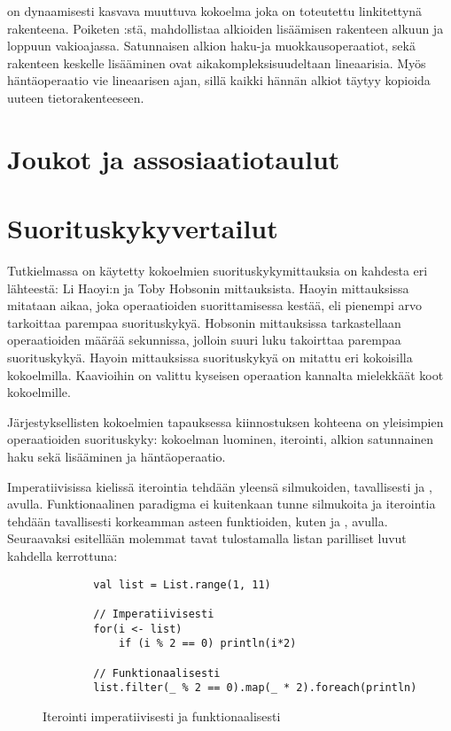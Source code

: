  on dynaamisesti kasvava muuttuva kokoelma joka on toteutettu linkitettynä rakenteena. Poiketen :stä,  mahdollistaa alkioiden lisäämisen rakenteen alkuun ja loppuun vakioajassa. Satunnaisen alkion haku-ja muokkausoperaatiot, sekä rakenteen keskelle lisääminen ovat aikakompleksisuudeltaan lineaarisia. Myös häntäoperaatio vie lineaarisen ajan, sillä kaikki hännän alkiot täytyy kopioida uuteen tietorakenteeseen.   
\cite{scalaCollections}


\section{Joukot ja assosiaatiotaulut}


\section{Suorituskykyvertailut}

Tutkielmassa on käytetty kokoelmien suorituskykymittauksia on kahdesta eri lähteestä: Li Haoyi:n\cite{haoyiBenchmark} ja Toby Hobsonin\cite{hobsonBenchmark} mittauksista. Haoyin mittauksissa mitataan aikaa, joka operaatioiden suorittamisessa kestää, eli pienempi arvo tarkoittaa parempaa suorituskykyä. Hobsonin mittauksissa tarkastellaan operaatioiden määrää sekunnissa, jolloin suuri luku takoirttaa parempaa suorituskykyä. Hayoin mittauksissa suorituskykyä on mitattu eri kokoisilla kokoelmilla. Kaavioihin on valittu kyseisen operaation kannalta mielekkäät koot kokoelmille.

Järjestyksellisten kokoelmien tapauksessa kiinnostuksen kohteena on yleisimpien operaatioiden suorituskyky: kokoelman luominen, iterointi, alkion satunnainen haku sekä lisääminen ja häntäoperaatio.

Imperatiivisissa kielissä iterointia tehdään yleensä silmukoiden, tavallisesti  ja , avulla. Funktionaalinen paradigma ei kuitenkaan tunne silmukoita ja iterointia tehdään tavallisesti korkeamman asteen funktioiden, kuten  ja , avulla.
\cite[Luku 2]{prorgrammingInScala3rd}
Seuraavaksi esitellään molemmat tavat tulostamalla listan parilliset luvut kahdella kerrottuna:
\begin{figure}[h]
    \begin{lstlisting}
        val list = List.range(1, 11)

        // Imperatiivisesti
        for(i <- list)
            if (i % 2 == 0) println(i*2)

        // Funktionaalisesti
        list.filter(_ % 2 == 0).map(_ * 2).foreach(println)
    \end{lstlisting}
    \caption{Iterointi imperatiivisesti ja funktionaalisesti}\label{iterointi_esim}
\end{figure}

